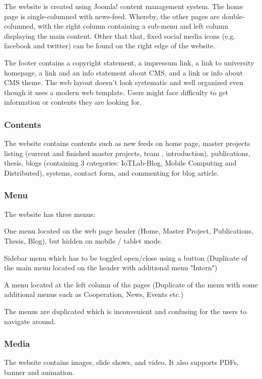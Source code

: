 The website is created using Joomla! content management system. The home page is single-columned with news-feed. Whereby, the other pages are double-columned, with the right column containing a sub-menu and left column displaying the main content. Other that that, fixed social media icons (e.g. facebook and twitter) can be found on the right edge of the website.

The footer contains a copyright statement, a impressum link, a link to university homepage, a link and an info statement about CMS, and a link or info about CMS theme. The web layout doesn't look systematic and well organized even though it uses a modern web template. Users might face difficulty to get information or contents they are looking for.

\subsubsection*{Contents}
The website contains contents such as new feeds on home page, master projects listing (current and finished master projects, team , introduction), publications, thesis, blogs (containing 3 categories: IoTLab-Blog, Mobile Computing and Distributed), systems, contact form, and commenting for blog article.

\subsubsection*{Menu}
The website has three menus:
\begin{itemize*}
\item One menu located on the web page header (Home, Master Project, Publications,  Thesis, Blog), but hidden on mobile / tablet mode.
\item Sidebar menu which has to be toggled open/close using a button (Duplicate of  the main menu located on the header with additional menu "Intern")
\item A menu located at the left column of the pages (Duplicate of the menu with some  additional menus such as Cooperation, News, Events etc.)
\end{itemize*}

The menus are duplicated which is inconvenient and confusing for the users to navigate around.

\subsubsection*{Media}
The website contains images, slide shows, and video. It also supports PDFs, banner and animation.

